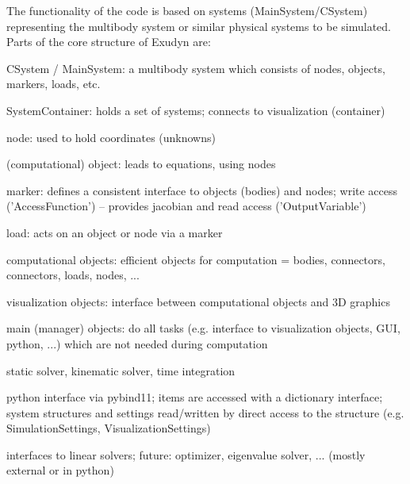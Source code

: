 The functionality of the code is based on systems (MainSystem/CSystem) representing the multibody system or similar physical systems to be simulated. Parts of the core structure of Exudyn are:
\bi
	\item CSystem / MainSystem: a multibody system which consists of nodes, objects, markers, loads, etc.
	\item SystemContainer: holds a set of systems; connects to visualization (container)
	\item node: used to hold coordinates (unknowns)
	\item (computational) object: leads to equations, using nodes
	\item marker: defines a consistent interface to objects (bodies) and nodes; write access ('AccessFunction') -- provides jacobian and read access ('OutputVariable')
	\item load: acts on an object or node via a marker
	\item computational objects: efficient objects for computation = bodies, connectors, connectors, loads, nodes, ...
	\item visualization objects: interface between computational objects and 3D graphics
	\item main (manager) objects: do all tasks (e.g. interface to visualization objects, GUI, python, ...) which are not needed during computation
	\item static solver, kinematic solver, time integration
	\item python interface via pybind11; items are accessed with a dictionary interface; system structures and settings read/written by direct access to the structure (e.g. SimulationSettings, VisualizationSettings)
	\item interfaces to linear solvers; future: optimizer, eigenvalue solver, ... (mostly external or in python)
\ei


